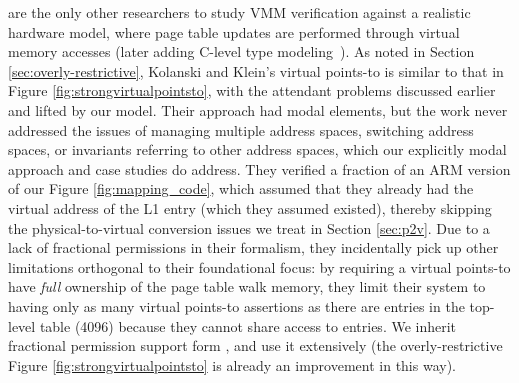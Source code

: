 \citet{kolanski08vstte} are the only other researchers to study VMM verification against a realistic hardware
model, where page table updates are performed through virtual memory accesses (later adding C-level type modeling~\cite{kolanski09tphols}).
As noted in Section \ref{sec:overly-restrictive}, Kolanski and Klein's virtual points-to is similar to that in Figure \ref{fig:strongvirtualpointsto},
with the attendant problems discussed earlier and lifted by our model. Their approach had modal elements,
but the work never addressed the issues of managing multiple address spaces, switching address spaces, or
invariants referring to other address spaces, which our explicitly modal approach and case studies do address.
They verified a fraction of an ARM version of our Figure \ref{fig:mapping_code}, which assumed that they already had the virtual address
of the L1 entry (which they assumed existed), thereby skipping the physical-to-virtual conversion issues we treat in Section \ref{sec:p2v}.
Due to a lack of fractional permissions in their formalism, they incidentally pick up other limitations orthogonal to their
foundational focus: by requiring
a virtual points-to have \emph{full} ownership of the page table walk memory, they limit their system to having only as many
virtual points-to assertions as there are entries in the top-level table (4096) because they cannot share access to entries.
We inherit fractional permission support form \iris, and use it extensively (the overly-restrictive
Figure \ref{fig:strongvirtualpointsto} is already an improvement in this way).
 

